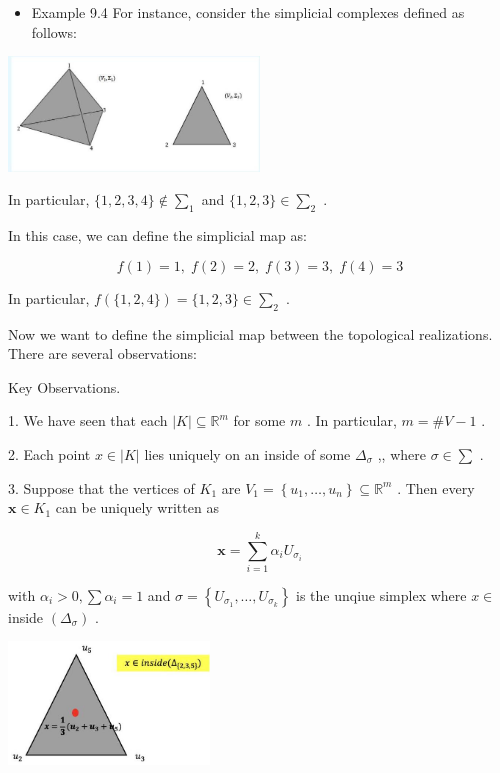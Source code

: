 \begin{itemize}
\item Example 9.4 For instance, consider the simplicial complexes defined as follows:
\end{itemize}

\begin{center}
\includegraphics[max width=0.5\textwidth]{images/bo_d2bcsrref24c73avs720_93_490_1193_678_311_0.jpg}
\end{center}
\hspace*{3em} 

In particular, \(\{ 1,2,3,4\}  \notin  {\sum }_{1}\) and \(\{ 1,2,3\}  \in  {\sum }_{2}\) .

In this case, we can define the simplicial map as:

\[
f\left( 1\right)  = 1,\;f\left( 2\right)  = 2,\;f\left( 3\right)  = 3,\;f\left( 4\right)  = 3
\]

In particular, \(f\left( {\{ 1,2,4\} }\right)  = \{ 1,2,3\}  \in  {\sum }_{2}\) .

Now we want to define the simplicial map between the topological realizations. There are several observations:

Key Observations.

1. We have seen that each \(\left| K\right|  \subseteq  {\mathbb{R}}^{m}\) for some \(m\) . In particular, \(m = \# V - 1\) .

2. Each point \(x \in  \left| K\right|\) lies uniquely on an inside of some \({\Delta }_{\sigma }\) ,, where \(\sigma  \in  \sum\) .

3. Suppose that the vertices of \({K}_{1}\) are \({V}_{1} = \left\{  {{u}_{1},\ldots ,{u}_{n}}\right\}   \subseteq  {\mathbb{R}}^{m}\) . Then every \(\mathbf{x} \in  {K}_{1}\) can be uniquely written as

\[
\mathbf{x} = \mathop{\sum }\limits_{{i = 1}}^{k}{\alpha }_{i}{U}_{{\sigma }_{i}}
\]

with \({\alpha }_{i} > 0,\sum {\alpha }_{i} = 1\) and \(\sigma  = \left\{  {{U}_{{\sigma }_{1}},\ldots ,{U}_{{\sigma }_{k}}}\right\}\) is the unqiue simplex where \(x \in\) inside \(\left( {\Delta }_{\sigma }\right)\) .

\begin{center}
\includegraphics[max width=0.4\textwidth]{images/bo_d2bcsrref24c73avs720_94_742_811_549_337_0.jpg}
\end{center}
\hspace*{3em} 

